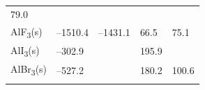 \documentclass[
  9pt,
]{extbook}
\theoremstyle{definition}
\theoremstyle{definition}
\theoremstyle{definition}
\theoremstyle{remark}
\begin{document}
\begin{longtable}[]{@{}lllll@{}}
\begin{minipage}[t]{0.18\columnwidth}
79.0\strut
\end{minipage}\tabularnewline
\begin{minipage}[t]{0.10\columnwidth}\raggedright
AlF\textsubscript{3}(s)\strut
\end{minipage} & \begin{minipage}[t]{0.19\columnwidth}\raggedright
--1510.4\strut
\end{minipage} & \begin{minipage}[t]{0.20\columnwidth}\raggedright
--1431.1\strut
\end{minipage} & \begin{minipage}[t]{0.18\columnwidth}\raggedright
66.5\strut
\end{minipage} & \begin{minipage}[t]{0.18\columnwidth}\raggedright
75.1\strut
\end{minipage}\tabularnewline
\begin{minipage}[t]{0.10\columnwidth}\raggedright
AlI\textsubscript{3}(s)\strut
\end{minipage} & \begin{minipage}[t]{0.19\columnwidth}\raggedright
--302.9\strut
\end{minipage} & \begin{minipage}[t]{0.20\columnwidth}\raggedright
\strut
\end{minipage} & \begin{minipage}[t]{0.18\columnwidth}\raggedright
195.9\strut
\end{minipage} & \begin{minipage}[t]{0.18\columnwidth}\raggedright
\strut
\end{minipage}\tabularnewline
\begin{minipage}[t]{0.10\columnwidth}\raggedright
AlBr\textsubscript{3}(s)\strut
\end{minipage} & \begin{minipage}[t]{0.19\columnwidth}\raggedright
--527.2\strut
\end{minipage} & \begin{minipage}[t]{0.20\columnwidth}\raggedright
\strut
\end{minipage} & \begin{minipage}[t]{0.18\columnwidth}\raggedright
180.2\strut
\end{minipage} & \begin{minipage}[t]{0.18\columnwidth}\raggedright
100.6\strut
\end{minipage}\tabularnewline
\begin{minipage}[t]{0.10\columnwidth}\raggedright

\end{minipage}
\end{longtable}
\end{document}

